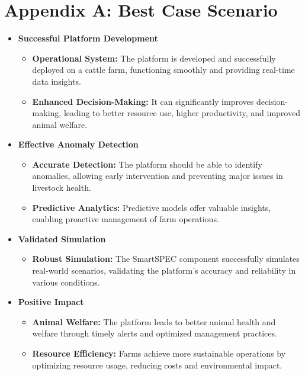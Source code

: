 \documentclass[11pt]{article}
\begin{document}
\section*{Appendix A: Best Case Scenario}
\begin{itemize}
    \item \textbf{Successful Platform Development}
    \begin{itemize}
        \item \textbf{Operational System:} The platform is developed and successfully deployed on a cattle farm, functioning smoothly and providing real-time data insights.
        \item \textbf{Enhanced Decision-Making:} It can significantly improves decision-making, leading to better resource use, higher productivity, and improved animal welfare.
    \end{itemize}
    \item \textbf{Effective Anomaly Detection}
    \begin{itemize}
        \item \textbf{Accurate Detection:} The platform should be able to identify anomalies, allowing early intervention and preventing major issues in livestock health.
        \item \textbf{Predictive Analytics:} Predictive models offer valuable insights, enabling proactive management of farm operations.
    \end{itemize}
    \item \textbf{Validated Simulation}
    \begin{itemize}
        \item \textbf{Robust Simulation:} The SmartSPEC component successfully simulates real-world scenarios, validating the platform's accuracy and reliability in various conditions.
    \end{itemize}
    \item \textbf{Positive Impact}
    \begin{itemize}
        \item \textbf{Animal Welfare:} The platform leads to better animal health and welfare through timely alerts and optimized management practices.
        \item \textbf{Resource Efficiency:} Farms achieve more sustainable operations by optimizing resource usage, reducing costs and environmental impact.
    \end{itemize}
\end{itemize}
\end{document}
